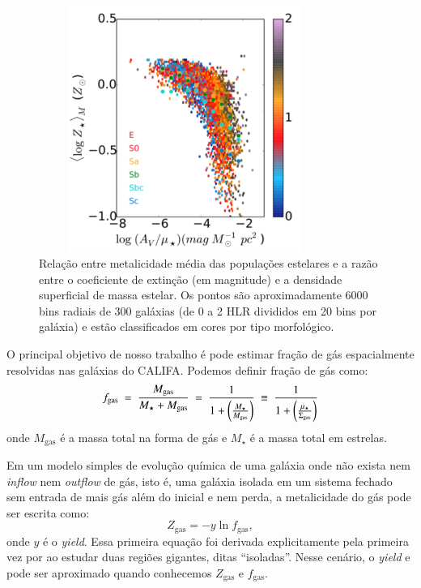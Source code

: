 \begin{figure}
	\centering
	\includegraphics[height = 8cm, width = 9.5cm]{figuras/dust2stars.pdf}
	\caption[$A_V / \mu_\star$ vs. ]
	{Relação entre metalicidade média das populações estelares e a razão entre o coeficiente de
extinção (em magnitude) e a densidade superficial de massa estelar. Os pontos são aproximadamente
6000 bins radiais de 300 galáxias (de 0 a 2 HLR divididos em 20 bins por galáxia) e estão
classificados em cores por tipo morfológico.}
	\label{fig:dust2stars}
\end{figure}

O principal objetivo de nosso trabalho é pode estimar fração de gás espacialmente resolvidas nas
galáxias do CALIFA. Podemos definir fração de gás como:
\begin{equation}
	f_{\mathrm{gas}}\ =\ \frac{M_{\mathrm{gas}}}{M_\star + M_{\mathrm{gas}}}\ =\ \frac{1}{1 +
	\left(\frac{M_\star}{M_{\mathrm{gas}}}\right)}\ \equiv\ \frac{1}{1 +
	\left(\frac{\mu_\star}{\SigmaGas}\right)}
	\label{eq:fgas}
\end{equation}
\noindent onde $M_{\mathrm{gas}}$ é a massa total na forma de gás e $M_\star$ é a massa total em
estrelas. 

Em um modelo simples de evolução química de uma galáxia onde não exista nem {\em inflow} nem {\em
outflow} de gás, isto é, uma galáxia isolada em um sistema fechado sem entrada de mais gás além do
inicial e nem perda, a metalicidade do gás pode ser escrita como:
\begin{equation}
	Z_{\mathrm{gas}} = - y \ln f_{\mathrm{gas}},
	\label{eq:Zgas_closedbox}
\end{equation}
\noindent onde $y$ é o {\em yield}. Essa primeira equação foi derivada explicitamente pela primeira
vez por \citet{Searle.Sargent.1972a} ao estudar duas regiões \Hii gigantes, ditas ``isoladas''.
Nesse cenário, o {\em yield} e pode ser aproximado quando conhecemos $Z_{\mathrm{gas}}$ e
$f_{\mathrm{gas}}$.

